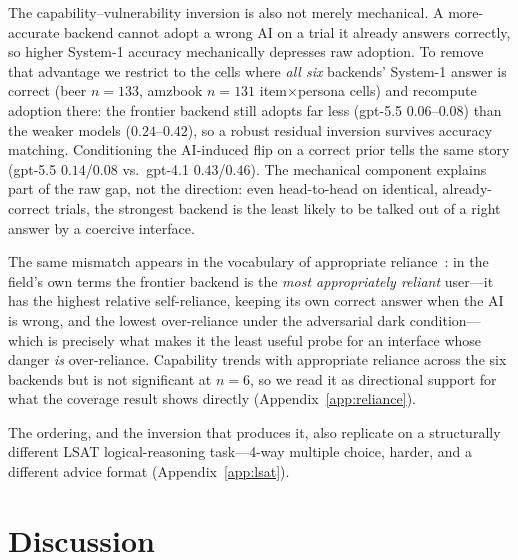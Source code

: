 \documentclass[manuscript,review,anonymous]{acmart}
\begin{document}
The capability--vulnerability inversion is also not merely mechanical. A more-accurate backend cannot adopt
a wrong AI on a trial it already answers correctly, so higher System-1 accuracy mechanically depresses raw
adoption. To remove that advantage we restrict to the cells where \emph{all six} backends' System-1 answer
is correct (beer $n{=}133$, amzbook $n{=}131$ item$\times$persona cells) and recompute adoption there: the
frontier backend still adopts far less (gpt-5.5 $0.06$--$0.08$) than the weaker models ($0.24$--$0.42$), so
a robust residual inversion survives accuracy matching. Conditioning the AI-induced flip on a correct prior
tells the same story (gpt-5.5 $0.14$/$0.08$ vs.\ gpt-4.1 $0.43$/$0.46$). The mechanical component explains
part of the raw gap, not the direction: even head-to-head on identical, already-correct trials, the
strongest backend is the least likely to be talked out of a right answer by a coercive interface.

The same mismatch appears in the vocabulary of appropriate reliance~\cite{schemmer2023appropriate}: in the
field's own terms the frontier backend is the \emph{most appropriately reliant} user---it has the highest
relative self-reliance, keeping its own correct answer when the AI is wrong, and the lowest over-reliance
under the adversarial dark condition---which is precisely what makes it the least useful probe for an
interface whose danger \emph{is} over-reliance. Capability trends with appropriate reliance across the six
backends but is not significant at $n=6$, so we read it as directional support for what the coverage result
shows directly (Appendix~\ref{app:reliance}).

The ordering, and the inversion that produces it, also replicate on a structurally different LSAT
logical-reasoning task---4-way multiple choice, harder, and a different advice format
(Appendix~\ref{app:lsat}).

\section{Discussion}
\end{document}
